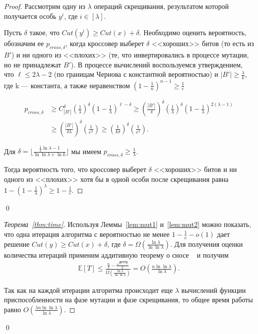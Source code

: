 \documentclass[times]{itmo-student-thesis}
\renewcommand{\binom}[2]{\mbox{$C^{#2}_{#1}$}}
\begin{document}
\begin{proof}
Рассмотрим одну из $\lambda$ операций скрещивания, результатом которой получается особь $y^i$, где $i \in [\lambda]$.

Пусть $\delta$ такое, что $Cut(y^i) \ge Cut(x) + \delta$.
Необходимо оценить вероятность, обозначим ее $p_{cross,\delta}$, когда кроссовер выберет $\delta$ <<хороших>> битов (то есть из $B'$) и ни одного из <<плохих>> (те, что инвертировались в процессе мутации, но не принадлежат $B'$).
В процессе вычислений воспользуемся утверждением, что $\ell \le 2\lambda - 2$ (по границам Чернова с константной вероятностью) и $|B'| \ge \frac{\lambda}{k}$, где k --- константа, а также неравенством $(1 - \frac{1}{n})^{n-1} \ge \frac{1}{e}$

\begin{align*}
p_{cross,\delta}
&\ge
    \binom{|B'|}{\delta}   \left(\frac{1}{\lambda}\right)^{\delta}\left(1 -\frac{1}{\lambda}\right)^{\ell - \delta}
\ge
    \left(\frac{|B'|}{\delta}\right)^{\delta}\left(\frac{1}{\lambda}\right)^{\delta}\left(1 -\frac{1}{\lambda}\right)^{2(\lambda -1)} \\
&\ge
    \left(\frac{|B'|}{\delta\lambda}\right)^{\delta}\left(\frac{1}{e^2}\right)
\ge \left(\frac{1}{k\delta}\right)^{\delta}\left(\frac{1}{e^2}\right).
\end{align*}

Для $\delta = \lfloor\frac{\frac{1}{2}\ln \lambda - 1}{\ln\ln \lambda + \ln k} \rfloor$ мы имеем $p_{cross,\delta} \ge \frac{1}{\lambda}$.

Тогда вероятность того, что кроссовер выберет $\delta$ <<хороших>> битов и ни одного из <<плохих>> хотя бы в одной особи после скрещивания равна $1 - (1 - \frac{1}{\lambda})^{\lambda} \ge 1 - \frac{1}{e}$.
\end{proof}\qed

\begin{proof}[Теорема~\ref{thm:time}]
Используя Леммы~\ref{lem:mut1} и~\ref{lem:mut2} можно показать, что одна итерация алгоритма с вероятностью не менее $1 - \frac{1}{e} - o(1)$ дает решение $Cut(y) \ge Cut(x) + \delta$, где $\delta = \Omega(\frac{\ln \lambda}{\ln \ln \lambda})$.
Для получения оценки количества итераций применим аддитивную теорему о сносе ~\cite{ссылка} и получим
\begin{align*}
  \mathbb{E}[T] \le \frac{\frac{n}{2} - \frac{\sqrt{n-2}}{2}}{\Omega(\frac{\ln \lambda}{\ln \ln \lambda})} = O\left(\frac{n\ln \ln \lambda}{\ln \lambda}\right).
\end{align*}

Так как на каждой итерации алгоритма происходит еще $\lambda$  вычислений функции приспособленности на фазе мутации и фазе скрещивания, то общее время работы равно $O\left(\frac{\lambda n\ln \ln \lambda}{\ln \lambda}\right)$.
\end{proof}\qed
\end{document}
